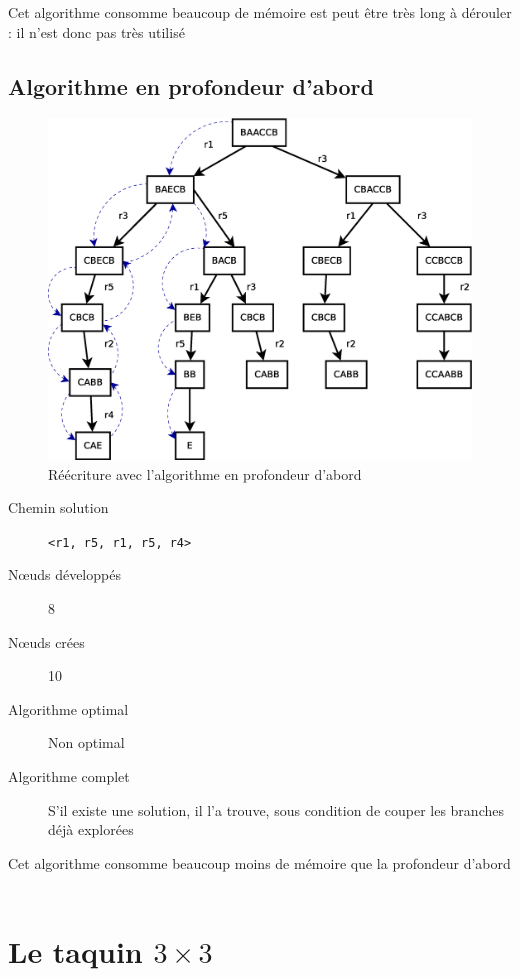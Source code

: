 \documentclass[12pt,a4paper,openany]{book}
\begin{document}
	\begin{remarque}
		Cet algorithme consomme beaucoup de mémoire est peut être très long à dérouler : il n'est donc pas très utilisé
	\end{remarque}

	\subsection{Algorithme en profondeur d'abord}
	\begin{figure}[H]
		\centering
		\includegraphics[width=15cm]{Diagramme2.eps}
		\caption{Réécriture avec l'algorithme en profondeur d'abord}
	\end{figure}
	\begin{description}
		\item[Chemin solution] \texttt{<r1, r5, r1, r5, r4>}
		\item[Nœuds développés] 8
		\item[Nœuds crées] 10
		\item[Algorithme optimal] Non optimal 
		\item[Algorithme complet] S'il existe une solution, il l'a trouve, sous condition de couper les branches déjà explorées
	\end{description}
	\begin{remarque}
		Cet algorithme consomme beaucoup moins de mémoire que la profondeur d'abord
\\~
	\end{remarque}

	\section{Le taquin $3\times 3$}
\end{document}
